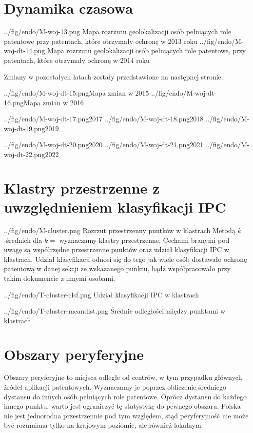 \section{Dynamika czasowa}


  \figsides
{../fig/endo/M-woj-13.png}
{ Mapa rozrzutu geolokalizacji osób pełniących role patentowe 
  przy patentach, które otrzymały ochronę w 2013 roku}
{../fig/endo/M-woj-dt-14.png}
{ Mapa rozrzutu geolokalizacji osób pełniących role patentowe, 
  przy patentach, które otrzymały ochronę w 2014 roku}

\bigskip
Zmiany w pozostałych latach zostały przedstawione na następnej stronie.

  \newpage\figsides
{../fig/endo/M-woj-dt-15.png}{Mapa zmian w 2015}
{../fig/endo/M-woj-dt-16.png}{Mapa zmian w 2016}

  \figsidesTri
{../fig/endo/M-woj-dt-17.png}{2017}
{../fig/endo/M-woj-dt-18.png}{2018}
{../fig/endo/M-woj-dt-19.png}{2019}

  \figsidesTri
{../fig/endo/M-woj-dt-20.png}{2020}
{../fig/endo/M-woj-dt-21.png}{2021}
{../fig/endo/M-woj-dt-22.png}{2022}


\newpage
\section{Klastry przestrzenne z uwzględnieniem klasyfikacji \ac{IPC}}

\figside
  {../fig/endo/M-cluster.png}
    {Rozrzut przestrzenny puntków w klastrach}
{
  Metodą $k$-średnich dla $k=$ wyznaczamy klastry przestrzenne. 
  Cechami branymi pod uwagę są współrzędne przestrzenne punktów oraz
  udział klasyfikacji \ac{IPC} w klastrach. Udział klasyfikacji
  odnosi się do tego jak wiele osób dostawało ochronę patentową
  w danej sekcji ze wskazanego punktu, bądź współpracowało przy
  takim dokumencie z innymi osobami.
}

\tblside
  {../fig/endo/T-cluster-clsf.png}
    {Udział klasyfikacji \ac{IPC} w klastrach}

\tblside
  {../fig/endo/T-cluster-meandist.png}
    {Średnie odległości między punktami w klastrach}



\newpage
\section{Obszary peryferyjne}

Obszary peryferyjne to miejsca odległe od centrów, w tym przypadku
głównych źródeł aplikacji patentowych. Wyznaczamy je poprzez obliczenie
średniego dystansu do innych osób pełniących role patentowe.
Oprócz dystansu do każdego innego punktu, warto jest ograniczyć
tę statystykę do pewnego obszaru. Polska nie jest jednorodna przestrzennie 
pod tym względem, stąd peryferyjność nie może być rozumiana tylko 
na krajowym poziomie, ale również lokalnym.

